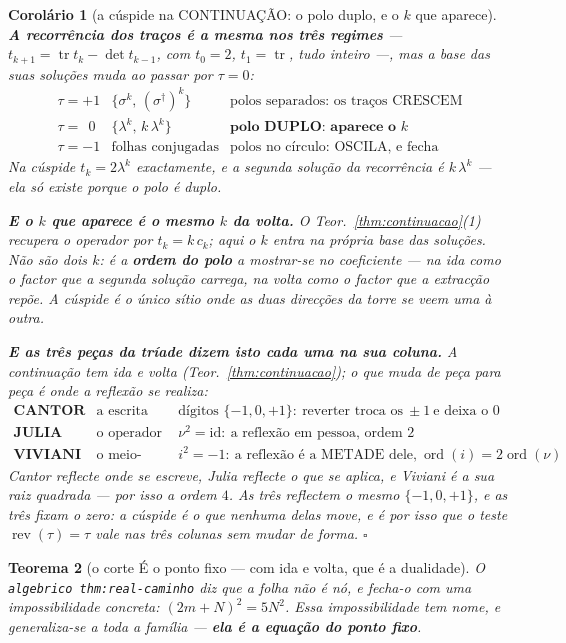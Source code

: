 \documentclass[11pt,a4paper]{article}
\newcommand{\code}[1]{\texttt{\small #1}}
\newtheorem{teorema}{Teorema}
\newtheorem{corolario}[teorema]{Corolário}
\newcommand{\dg}{^{\dagger}}
\begin{document}
\begin{corolario}[a cúspide na CONTINUAÇÃO: o polo duplo, e o $k$ que
aparece]
\textbf{A recorrência dos traços é a mesma nos três regimes} ---
$t_{k+1}=\operatorname{tr}t_k-\det t_{k-1}$, com $t_0=2$, $t_1=\operatorname{tr}$, tudo
inteiro ---, \emph{mas a base das suas soluções muda ao passar por $\tau=0$}:
\[
\begin{array}{lll}
\tau=+1 & \{\sigma^{k},\,(\sigma\dg)^{k}\} & \text{polos separados: os traços CRESCEM}\\
\tau=\ \ 0 & \{\lambda^{k},\,k\,\lambda^{k}\} & \textbf{polo DUPLO: aparece o }k\\
\tau=-1 & \text{folhas conjugadas} & \text{polos no círculo: OSCILA, e fecha}
\end{array}
\]
Na cúspide $t_k=2\lambda^{k}$ exactamente, e a segunda solução da recorrência é
$k\,\lambda^{k}$ --- ela \emph{só existe} porque o polo é duplo.

\textbf{E o $k$ que aparece é o mesmo $k$ da volta.} O Teor.~\ref{thm:continuacao}(1)
recupera o operador por $t_k=k\,c_k$; aqui o $k$ entra na própria base das soluções. Não são
dois $k$: é a \textbf{ordem do polo} a mostrar-se no coeficiente --- na ida como o
factor que a segunda solução carrega, na volta como o factor que a extracção repõe.
\emph{A cúspide é o único sítio onde as duas direcções da torre se veem uma à outra.}

\textbf{E as três peças da tríade dizem isto cada uma na sua coluna.} A continuação tem ida
e volta (Teor.~\ref{thm:continuacao}); o que muda de peça para peça é \emph{onde} a
reflexão se realiza:
\[
\begin{array}{lll}
\textbf{CANTOR} & \text{a escrita} & \text{dígitos }\{-1,0,+1\}:\ \text{reverter troca os}
\ \pm1\ \text{e deixa o }0\\[2pt]
\textbf{JULIA} & \text{o operador} & \nu^{2}=\mathrm{id}:\ \text{a reflexão em pessoa,
ordem }2\\[2pt]
\textbf{VIVIANI} & \text{o meio-ângulo} & i^{2}=-1:\ \text{a reflexão é a METADE dele,}
\ \operatorname{ord}(i)=2\operatorname{ord}(\nu)
\end{array}
\]
Cantor reflecte \emph{onde se escreve}, Julia reflecte \emph{o que se aplica}, e Viviani é
a sua raiz quadrada --- por isso a ordem $4$. \emph{As três reflectem o mesmo
$\{-1,0,+1\}$}, e as três fixam o zero: a cúspide é o que nenhuma delas move, e é por isso
que o teste $\operatorname{rev}(\tau)=\tau$ vale nas três colunas sem mudar de forma.
$\square$
\end{corolario}\begin{teorema}[o corte É o ponto fixo --- com ida e volta, que é a
dualidade]\label{thm:corte-ponto-fixo}
O \code{algebrico thm:real-caminho} diz que \emph{a folha não é nó}, e fecha-o com uma
impossibilidade concreta: $(2m+N)^{2}=5N^{2}$. Essa impossibilidade tem nome, e
generaliza-se a toda a família --- \textbf{ela é a equação do ponto fixo}.


\end{teorema}
\end{document}
